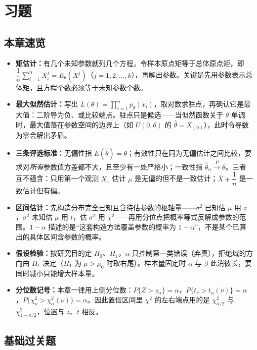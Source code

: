 \section{习题}

\subsection{本章速览}

\begin{itemize}
\item \textbf{矩估计：}有几个未知参数就列几个方程，令样本原点矩等于总体原点矩，即 $\dfrac{1}{n}\sum_{i=1}^{n}X_i^{j}=E_\theta(X^{j})$（$j=1,2,\ldots,k$），再解出参数。关键是先用参数表示总体矩，且方程个数必须等于未知参数个数。
\item \textbf{最大似然估计：}写出 $L(\theta)=\prod_{i=1}^{n}p_\theta(x_i)$，取对数求驻点，再确认它是最大值：二阶导为负、或比较端点。驻点只是候选——当似然函数关于 $\theta$ 单调时，最大值落在参数空间的边界上（如 $U(0,\theta)$ 的 $\widehat\theta=X_{(n)}$），此时令导数为零会解出矛盾。
\item \textbf{三条评选标准：}无偏性指 $E(\widehat\theta)=\theta$；有效性只在同为无偏估计之间比较，要求对\emph{所有}参数值方差都不大，且至少有一处严格小；一致性指 $\widehat\theta_n\xrightarrow{P}\theta$。三者互不蕴含：只用第一个观测 $X_1$ 估计 $\mu$ 是无偏的但不是一致估计；$\bar X+\dfrac{1}{n}$ 是一致估计但有偏。
\item \textbf{区间估计：}先构造分布完全已知且含待估参数的枢轴量——$\sigma^{2}$ 已知估 $\mu$ 用 $z$，$\sigma^{2}$ 未知估 $\mu$ 用 $t$，估 $\sigma^{2}$ 用 $\chi^{2}$——再用分位点把概率等式反解成参数的范围。$1-\alpha$ 描述的是“这套构造方法覆盖参数的概率为 $1-\alpha$”，不是某个已算出的具体区间含参数的概率。
\item \textbf{假设检验：}按研究目的定 $H_0$、$H_1$，$\alpha$ 只控制第一类错误（弃真），拒绝域的方向由 $H_1$ 决定（$H_1$ 为 $\mu>\mu_0$ 时取右尾）。样本量固定时 $\alpha$ 与 $\beta$ 此消彼长，要同时减小只能增大样本量。
\item \textbf{分位数记号：}本章一律用上侧分位数：$P\{Z>z_\alpha\}=\alpha$，$P\{t_\nu>t_\alpha(\nu)\}=\alpha$，$P\{\chi^{2}_\nu>\chi^{2}_\alpha(\nu)\}=\alpha$。因此置信区间里 $\chi^{2}$ 的左右端点用的是 $\chi^{2}_{\alpha/2}$ 与 $\chi^{2}_{1-\alpha/2}$，位置与 $z$、$t$ 相反。
\end{itemize}

\subsection{基础过关题}

